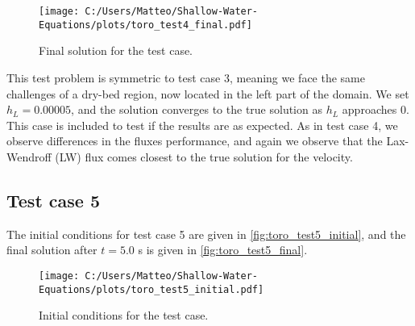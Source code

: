 \begin{figure}[H]
    \centering
    \texttt{[image: C:/Users/Matteo/Shallow-Water-Equations/plots/toro\_test4\_final.pdf]}
    \caption{Final solution for the test case.}\label{fig:toro_test4_final}
\end{figure}
This test problem is symmetric to test case 3, meaning we face the same challenges of a dry-bed region, now located in the left part of the domain.
We set $h_L = 0.00005$, and the solution converges to the true solution as $h_L$ approaches 0.
This case is included to test if the results are as expected.
As in test case 4, we observe differences in the fluxes performance, and again we observe that the Lax-Wendroff (LW) flux comes closest to the true solution for the velocity.

\subsection*{Test case 5}
The initial conditions for test case 5 are given in \autoref{fig:toro_test5_initial}, and the final solution after $t=5.0$ s is given in \autoref{fig:toro_test5_final}.
\begin{figure}[H]
    \centering
    \texttt{[image: C:/Users/Matteo/Shallow-Water-Equations/plots/toro\_test5\_initial.pdf]}
    \caption{Initial conditions for the test case.}\label{fig:toro_test5_initial}
\end{figure}

